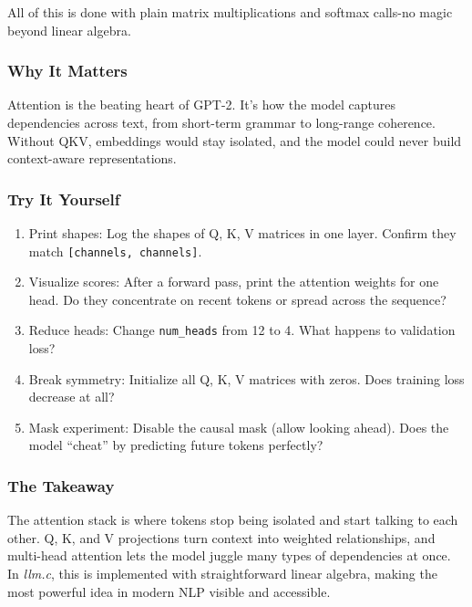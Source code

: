 \documentclass[
  letterpaper,
  DIV=11,
  numbers=noendperiod]{scrreprt}
\providecommand{\tightlist}{%
  \setlength{\itemsep}{0pt}\setlength{\parskip}{0pt}}
\begin{document}
All of this is done with plain matrix multiplications and softmax
calls-no magic beyond linear algebra.

\subsubsection{Why It Matters}\label{why-it-matters-11}

Attention is the beating heart of GPT-2. It's how the model captures
dependencies across text, from short-term grammar to long-range
coherence. Without QKV, embeddings would stay isolated, and the model
could never build context-aware representations.

\subsubsection{Try It Yourself}\label{try-it-yourself-13}

\begin{enumerate}
\def\labelenumi{\arabic{enumi}.}
\tightlist
\item
  Print shapes: Log the shapes of Q, K, V matrices in one layer. Confirm
  they match \texttt{{[}channels,\ channels{]}}.
\item
  Visualize scores: After a forward pass, print the attention weights
  for one head. Do they concentrate on recent tokens or spread across
  the sequence?
\item
  Reduce heads: Change \texttt{num\_heads} from 12 to 4. What happens to
  validation loss?
\item
  Break symmetry: Initialize all Q, K, V matrices with zeros. Does
  training loss decrease at all?
\item
  Mask experiment: Disable the causal mask (allow looking ahead). Does
  the model ``cheat'' by predicting future tokens perfectly?
\end{enumerate}

\subsubsection{The Takeaway}\label{the-takeaway-13}

The attention stack is where tokens stop being isolated and start
talking to each other. Q, K, and V projections turn context into
weighted relationships, and multi-head attention lets the model juggle
many types of dependencies at once. In \emph{llm.c}, this is implemented
with straightforward linear algebra, making the most powerful idea in
modern NLP visible and accessible.
\end{document}
